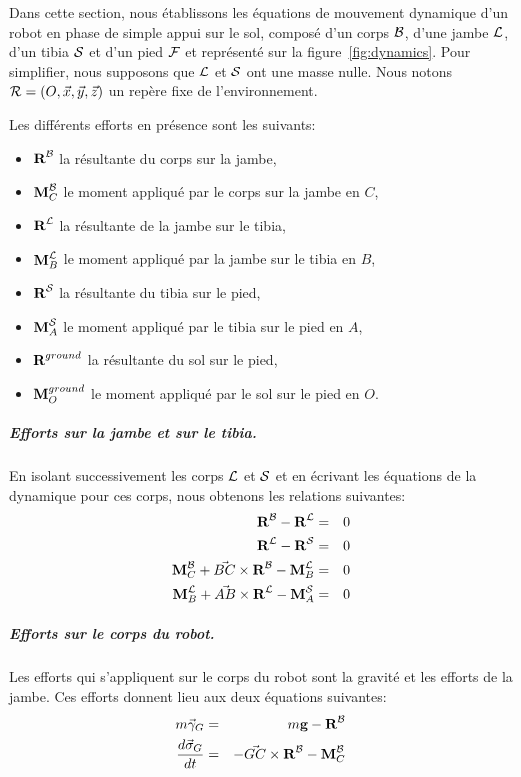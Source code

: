 Dans cette section, nous établissons les équations de mouvement
dynamique d'un robot en phase de simple appui sur le sol, composé d'un
corps ${\cal B}$, d'une jambe ${\cal L}$, d'un tibia ${\cal S}$ et
d'un pied ${\cal F}$ et représenté sur la figure \ref{fig:dynamics}.
Pour simplifier, nous supposons que ${\cal L}$ et ${\cal S}$ ont une masse
nulle. Nous notons ${\cal R}=(O,\vec{x},\vec{y},\vec{z})$ un repère
fixe de l'environnement.

Les différents efforts en présence sont les suivants:
\begin{itemize}
  \item $\textbf{R}^{\cal B}$ la résultante du corps sur la jambe,
  \item $\textbf{M}^{\cal B}_C$ le moment  appliqué par le
    corps sur la jambe en $C$,
  \item $\textbf{R}^{\cal L}$ la résultante de la jambe sur le tibia,
  \item $\textbf{M}^{\cal L}_B$ le moment  appliqué par la
    jambe sur le tibia en $B$,
  \item $\textbf{R}^{\cal S}$ la résultante du tibia sur le pied,
  \item $\textbf{M}^{\cal S}_A$ le moment  appliqué par le
    tibia sur le pied en $A$,
  \item $\textbf{R}^{ground}$ la résultante du sol sur le pied,
  \item $\textbf{M}^{ground}_O$ le moment appliqué par le sol sur le pied en $O$.
\end{itemize}

\subparagraph{Efforts sur la jambe et sur le tibia.}
En isolant successivement les corps ${\cal L}$ et ${\cal S}$ et en
écrivant les équations de la dynamique pour ces corps, nous obtenons
les relations suivantes:
\begin{eqnarray}
  \label{eq:resultante-L}
  \textbf{R}^{\cal B} - \textbf{R}^{\cal L} &=& 0 \\
  \label{eq:resultante-S}
  \textbf{R}^{\cal L} - \textbf{R}^{\cal S} &=& 0 \\
  \label{eq:moment-L}
  \textbf{M}^{\cal B}_C + \vec{BC}\times \textbf{R}^{\cal B} -
  \textbf{M}^{\cal L}_B &=& 0 \\
  \label{eq:moment-S}
  \textbf{M}^{\cal L}_B + \vec{AB}\times \textbf{R}^{\cal L} -
  \textbf{M}^{\cal S}_A &=& 0
\end{eqnarray}

\subparagraph{Efforts sur le corps du robot.}
Les efforts qui s'appliquent sur le corps du robot sont la gravité et
les efforts de la jambe. Ces efforts donnent lieu aux deux équations
suivantes:
\begin{eqnarray}\label{eq:resultante-B}
m \vec{\gamma}_G &=& m\textbf{g} - \textbf{R}^{\cal B} \\
\label{eq:moment-B}
\frac{d\vec{\sigma}_G}{dt} &=& -\vec{GC}\times \textbf{R}^{\cal B} - \textbf{M}^{\cal B}_C
\end{eqnarray}

